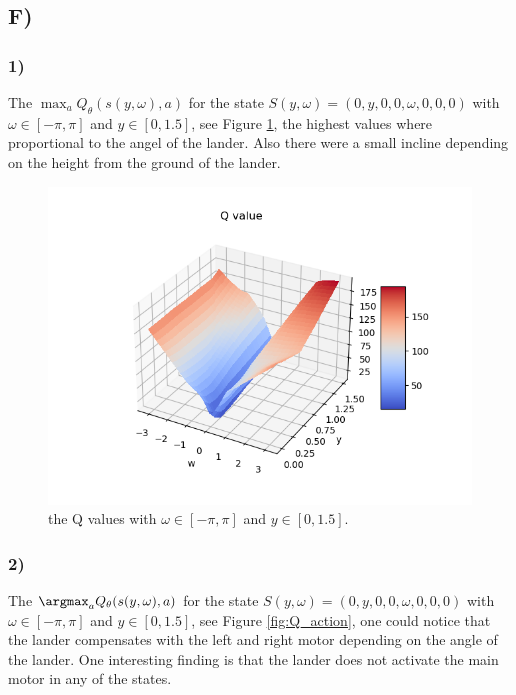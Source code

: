 \documentclass{article}
\begin{document}
\subsection*{F)}
\subsubsection*{1)}
The $\max_a Q_\theta(s(y,\omega),a)$ for the state $S(y,\omega) = (0,y,0,0,\omega,0,0,0)$ with $\omega \in [-\pi,\pi] $ and $y \in [0, 1.5]$, see Figure \ref{fig:Q_value}, the highest values where proportional to the angel of the lander. Also there were a small incline depending on the height from the ground of the lander. 
\begin{figure}[H]
    \centering
    \includegraphics[width=1\textwidth]{Lab_2/problem1/images/Q_value.png}
    \caption{\small the Q values with $\omega \in [-\pi,\pi] $ and $y \in [0, 1.5]$.}
    \label{fig:Q_value}
\end{figure}

\subsubsection*{2)}
The $\argmax_a Q_\theta(s(y,\omega),a)$ for the state $S(y,\omega) = (0,y,0,0,\omega,0,0,0)$ with $\omega \in [-\pi,\pi] $ and $y \in [0, 1.5]$, see Figure \ref{fig:Q_action}, one could notice that the lander compensates with the left and right motor depending on the angle of the lander. One interesting finding is that the lander does not activate the main motor in any of the states.
\end{document}

